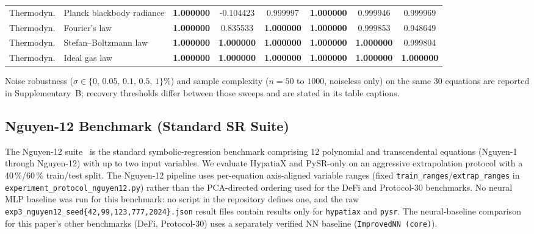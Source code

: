 \documentclass[twoside,11pt]{article}
\begin{document}
{\begin{longtable}{p{1.9cm}p{4.3cm}cccccc}
Thermodyn. & Planck blackbody radiance & \textbf{1.000000} & -0.104423 & 0.999997 & \textbf{1.000000} & 0.999946 & 0.999969 \\
Thermodyn. & Fourier's law & \textbf{1.000000} & 0.835533 & \textbf{1.000000} & \textbf{1.000000} & 0.999853 & 0.948649 \\
Thermodyn. & Stefan--Boltzmann law & \textbf{1.000000} & \textbf{1.000000} & \textbf{1.000000} & \textbf{1.000000} & \textbf{1.000000} & 0.999804 \\
Thermodyn. & Ideal gas law & \textbf{1.000000} & \textbf{1.000000} & \textbf{1.000000} & \textbf{1.000000} & \textbf{1.000000} & \textbf{1.000000} \\
\bottomrule
\end{longtable}}

Noise robustness ($\sigma \in \{0,\,0.05,\,0.1,\,0.5,\,1\}\%$) and sample complexity ($n=50$ to $1000$, noiseless only) on the same 30 equations are reported in Supplementary~B; recovery thresholds differ between those sweeps and are stated in its table captions.

\subsection{Nguyen-12 Benchmark (Standard SR Suite)}\label{subsec:nguyen12-benchmark-standard-sr-suite}
\label{sec:nguyen12}

The Nguyen-12 suite~\citep{uy2011semantically} is the standard symbolic-regression
benchmark comprising 12 polynomial and transcendental equations (Nguyen-1 through
Nguyen-12) with up to two input variables.  We evaluate HypatiaX and PySR-only on
an aggressive extrapolation protocol with a 40\,\%/60\,\% train/test split.
The Nguyen-12 pipeline uses per-equation axis-aligned variable ranges (fixed
\texttt{train\_ranges}/\texttt{extrap\_ranges} in \texttt{experiment\_protocol\_nguyen12.py})
rather than the PCA-directed ordering used for the DeFi and Protocol-30 benchmarks.
No neural MLP baseline was run for this benchmark: no script in the repository defines
one, and the raw \texttt{exp3\_nguyen12\_seed\{42,99,123,777,2024\}.json} result files
contain results only for \texttt{hypatiax} and \texttt{pysr}. The neural-baseline
comparison for this paper's other benchmarks (DeFi, Protocol-30) uses a separately
verified NN baseline (\texttt{ImprovedNN (core)}).
\end{document}
